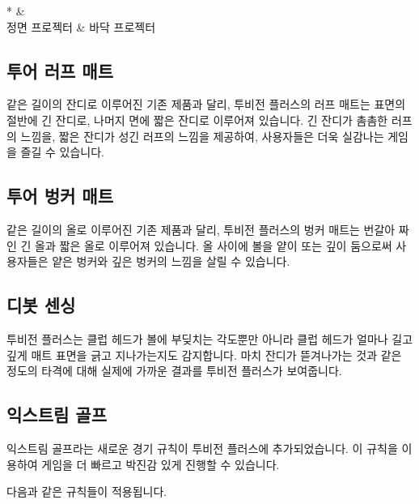 \documentclass[10pt, openright, language=korean]{hzguide}
\begin{document}
\begin{ImageTable}*
 &   \\
정면 프로젝터 & 바닥 프로젝터 \\
\end{ImageTable}

\subsection{투어 러프 매트}


같은 길이의 잔디로 이루어진 기존 제품과 달리, 투비전 플러스의 러프 매트는 표면의 절반에 긴 잔디로, 나머지 면에 짧은 잔디로 이루어져 있습니다.
긴 잔디가 촘촘한 러프의 느낌을, 짧은 잔디가 성긴 러프의 느낌을 제공하여, 사용자들은 더욱 실감나는 게임을 즐길 수 있습니다.

\subsection{투어 벙커 매트}


같은 길이의 올로 이루어진 기존 제품과 달리, 투비전 플러스의 벙커 매트는 번갈아 짜인 긴 올과 짧은 올로 이루어져 있습니다.
올 사이에 볼을 얕이 또는 깊이 둠으로써 사용자들은 얕은 벙커와 깊은 벙커의 느낌을 살릴 수 있습니다.

\subsection{디봇 센싱}


투비전 플러스는 클럽 헤드가 볼에 부딪치는 각도뿐만 아니라 클럽 헤드가 얼마나 길고 깊게 매트 표면을 긁고 지나가는지도 감지합니다.
마치 잔디가 뜯겨나가는 것과 같은 정도의 타격에 대해 실제에 가까운 결과를 투비전 플러스가 보여줍니다.

\subsection{익스트림 골프}

익스트림 골프라는 새로운 경기 규칙이 투비전 플러스에 추가되었습니다. 이 규칙을 이용하여 게임을 더 빠르고 박진감 있게 진행할 수 있습니다.


다음과 같은 규칙들이 적용됩니다.
\end{document}
